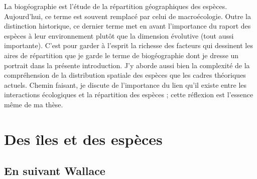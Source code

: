 La biogéographie est l'étude de la répartition géographiques des
espèces. Aujourd'hui, ce terme est souvent remplacé par celui de
macroécologie. Outre la distinction historique, ce dernier terme met en
avant l'importance du raport des espèces à leur environnement plutôt que
la dimension évolutive (tout aussi importante). C'est pour garder à
l'esprit la richesse des facteurs qui dessinent les aires de répartition
que je garde le terme de biogéographie dont je dresse un portrait dans
la présente introduction. J'y aborde aussi bien la complexité de la
compréhension de la distribution spatiale des espèces que les cadres
théoriques actuels. Chemin faisant, je discute de l'importance du lien
qu'il existe entre les interactions écologiques et la répartition des
espèces ; cette réflexion est l'essence même de ma thèse.

\section*{Des îles et des espèces}\label{des-uxeeles-et-des-espuxe8ces}

\subsection*{En suivant Wallace}\label{en-suivant-wallace}

